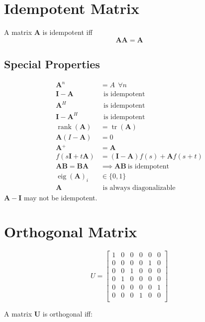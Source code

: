 \documentclass{book}
\newcommand{\mA}{\mathbf{A}}
\newcommand{\mB}{\mathbf{B}}
\newcommand{\mI}{\mathbf{I}}
\newcommand{\mU}{\mathbf{U}}
\DeclareMathOperator{\eig}{eig}
\DeclareMathOperator{\trace}{tr}
\DeclareMathOperator{\rank}{rank}
\newcommand{\pinv}{\!^+}
\begin{document}
\section{Idempotent Matrix}
A matrix $\mA$ is idempotent iff
\begin{equation}
\mA\mA=\mA
\end{equation}

\subsection*{Special Properties}
\begin{align}
\mA^n        &=A~~\forall n              \\
\mI-\mA      &~~\textrm{is idempotent}   \\
\mA^H        &~~\textrm{is idempotent}   \\
\mI-\mA^H    &~~\textrm{is idempotent}   \\
\rank(\mA)   &= \trace(\mA)              \\
\mA(I-\mA)   &= 0                        \\
\mA\pinv     &= \mA                      \\
f(s\mI+t\mA) &= (\mI-\mA)f(s)+\mA f(s+t) \\
\mA\mB=\mB\mA&\implies \mA\mB~\textrm{is idempotent} \\
\eig(\mA)_i  &\in \{0,1\} \\
\mA & \textrm{~is always diagonalizable}
\end{align}
$\mA-\mI$ may not be idempotent.




\section{Orthogonal Matrix}


\begin{equation}
U=
\begin{bmatrix}
1 & 0 & 0 & 0 & 0 & 0 \\
0 & 0 & 0 & 0 & 1 & 0 \\
0 & 0 & 1 & 0 & 0 & 0 \\
0 & 1 & 0 & 0 & 0 & 0 \\
0 & 0 & 0 & 0 & 0 & 1 \\
0 & 0 & 0 & 1 & 0 & 0 \\
\end{bmatrix}
\end{equation}

A matrix $\mU$ is orthogonal iff:
\end{document}
